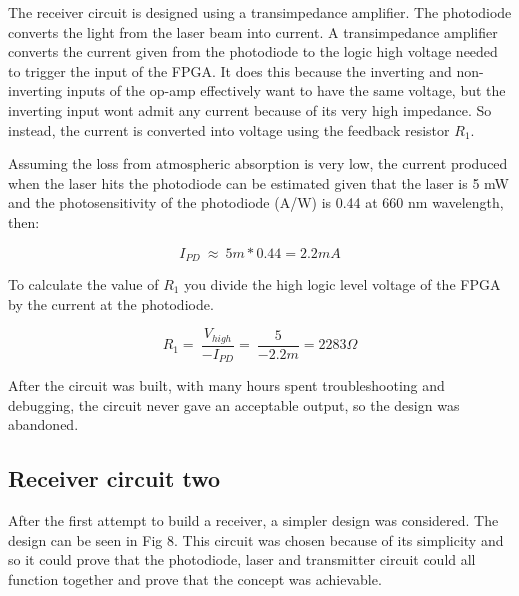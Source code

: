 \documentclass[conference]{IEEEtran}
\begin{document}
The receiver circuit is designed using a transimpedance amplifier. The photodiode converts the light from the laser beam into current. A transimpedance amplifier converts the current given from the photodiode to the logic high voltage needed to trigger the input of the FPGA. It does this because the inverting and non-inverting inputs of the op-amp effectively want to have the same voltage, but the inverting input wont admit any current because of its very high impedance. So instead, the current is converted into voltage using the feedback resistor $R_{1}$.

Assuming the loss from atmospheric absorption is very low, the current produced when the laser hits the photodiode can be estimated given that the laser is 5 mW and the photosensitivity of the photodiode (A/W) is 0.44 at 660 nm wavelength, then:

\begin{equation}
I_{PD}\ \approx{}\ 5m*0.44=2.2 mA
\end{equation}

To calculate the value of $R_{1}$ you divide the high logic level voltage of the FPGA by the current at the photodiode. 

\begin{equation}
R_1=\ \frac{V_{high}}{-I_{PD}}=\ \frac{5}{-2.2m}=2283\Omega{}
\end{equation}

After the circuit was built, with many hours spent troubleshooting and debugging, the circuit never gave an acceptable output, so the design was abandoned.

\subsection{Receiver circuit two}

After the first attempt to build a receiver, a simpler design was considered. The design can be seen in Fig 8. This circuit was chosen because of its simplicity and so it could prove that the photodiode, laser and transmitter circuit could all function together and prove that the concept was achievable.\\\\
\end{document}
